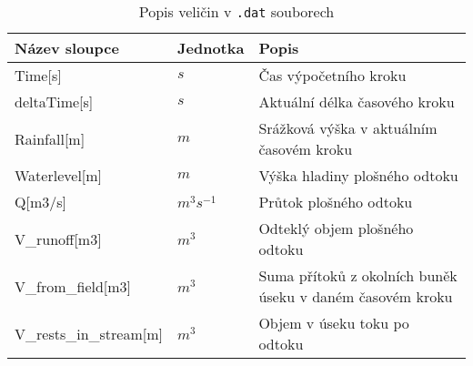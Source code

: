 \begin{table}[h!]
 

 \centering
 \caption{Popis veličin  v {\tt.dat} souborech}
\label{tab:vystupytokdat}

 \begin{tabular}{llp{}}
  \hline  \hline
 Název sloupce        & Jednotka     & Popis                                      \\ 
 \hline
 Time[s]              &   $s$         &  Čas výpočetního kroku                    \\
 deltaTime[s]         &   $s$         &  Aktuální délka časového kroku            \\
 Rainfall[m]          &  $m$          &  Srážková výška v aktuálním časovém kroku \\
 Waterlevel[m]        &  $m$          &  Výška hladiny plošného odtoku            \\
 Q[m3/s]              &  $m^3s^{-1}$  &  Průtok plošného odtoku                   \\
  V\_runoff[m3]                  &  $m^3$     & Odteklý objem plošného odtoku     \\
 V\_from\_field[m3]              &  $m^3$     & Suma přítoků z okolních buněk úseku v daném časovém kroku \\
 V\_rests\_in\_stream[m]         &  $m^3$     & Objem v úseku toku po odtoku      \\
  \hline
   \hline
 \end{tabular}

\end{table}

